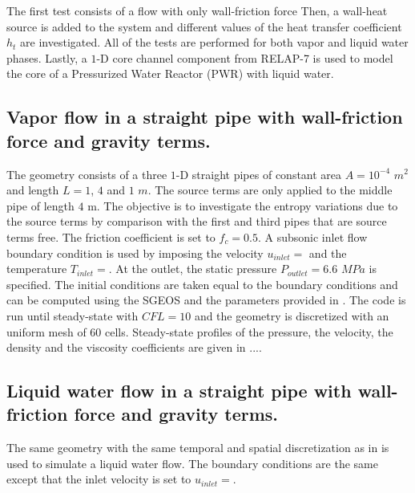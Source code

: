 %
The first test consists of a flow with only wall-friction force Then, a wall-heat source is added to the system and different values of the heat transfer coefficient $h_t$ are investigated. All of the tests are performed for both vapor and liquid water phases. Lastly, a $1$-D core channel component from RELAP-7 is used to model the core of a Pressurized Water Reactor (PWR) with liquid water.
\subsection{Vapor flow in a straight pipe with wall-friction force and gravity terms.} \label{sec:1d-wall-fricition-vapor}
The geometry consists of a three $1$-D straight pipes of constant area $A= 10^{-4}$ $m^2$ and length $L=1$, $4$ and $1$ $m$. The source terms are only applied to the middle pipe of length $4$ m. The objective is to investigate the entropy variations due to the source terms by comparison with the first and third pipes that are source terms free. The friction coefficient is set to $f_c = 0.5$. A subsonic inlet flow boundary condition is used by imposing the velocity $u_{inlet} = $ and the temperature $T_{inlet}=$. At the outlet, the static pressure $P_{outlet}=6.6$ $MPa$ is specified. The initial conditions are taken equal to the boundary conditions and can be computed using the SGEOS and the parameters provided in . The code is run until steady-state with $CFL=10$ and the geometry is discretized with an uniform mesh of $60$ cells. Steady-state profiles of the pressure, the velocity, the density and the viscosity coefficients are given in ....
\subsection{Liquid water flow in a straight pipe with wall-friction force and gravity terms.} \label{sec:1d-wall-fricition-liquid}
The same geometry with the same temporal and spatial discretization as in  is used to simulate a liquid water flow. The boundary conditions are the same except that the inlet velocity is set to $u_{inlet}=$. 

